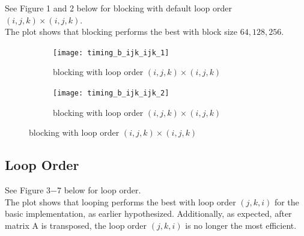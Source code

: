 \documentclass[12pt]{article}
\numberwithin{equation}{section}
\begin{document}
See Figure 1 and 2 below for blocking with default loop order $(i, j, k)\times(i, j, k)$.
\\
The plot shows that blocking performs the best with block size $64, 128, 256$.

\begin{figure}[!ht]
   \begin{subfigure}
      \centering
        \begin{center}
      \texttt{[image: timing\_b\_ijk\_ijk\_1]}
        \end{center}
      \label{aload0}
      \caption{blocking with loop order $(i, j, k)\times(i, j, k)$}
  \end{subfigure}
  \begin{subfigure}
      \centering
        \begin{center}
      \texttt{[image: timing\_b\_ijk\_ijk\_2]}
        \end{center}
      \label{aload1}
      \caption{blocking with loop order $(i, j, k)\times(i, j, k)$}
  \end{subfigure}

\end{figure}

\subsection{Loop Order}

See Figure 3$-$7 below for loop order.
\\
The plot shows that looping performs the best with loop order $(j, k, i)$ for the basic implementation, as earlier hypothesized. Additionally, as expected, after matrix A is transposed, the loop order $(j,k,i)$ is no longer the most efficient.
\end{document}
